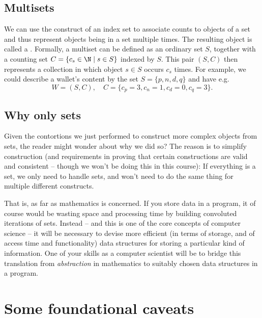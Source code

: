 \subsection{Multisets}

We can use the construct of an index set to associate counts to objects of a
set and thus represent objects being in a set multiple times. The resulting
object is called a . Formally, a multiset can be defined as
an ordinary set $S$, together with a counting set $C=\{c_s\in\N\mid s\in
S\}$ indexed by $S$. This pair $(S,C)$ then represents a collection in which
object $s\in S$ occurs  $c_s$ times. For example, we could describe a
wallet's content by the set $S=\{p,n,d,q\}$ 
and have e.g. 
\[
W=(S,C),\quad C=\{c_p=3,c_n=1,c_d=0,c_q=3\}.
\]

\subsection{Why only sets}

\bonussection
Given the contortions we just performed to construct more complex objects
from sets, the reader might wonder about why we did so? The reason is to
simplify construction (and requirements in proving that certain
constructions are valid and consistent -- though we won't be doing this in
this course): If everything is a set, we only need to handle sets, and won't
need to do the same thing for multiple different constructs.

That is, as far as mathematics is concerned. If you store data in a program,
it of course would be wasting space and processing time  by building
convoluted iterations of sets. Instead -- and this is one of the core
concepts of computer science -- it will be necessary to devise more
efficient (in terms of storage, and of access time and functionality) data
structures for storing a particular kind of information. One of your skills
as a computer scientist will be to bridge this translation from {\em
abstraction} in mathematics to suitably chosen data structures in a program.

\section{Some foundational caveats}

